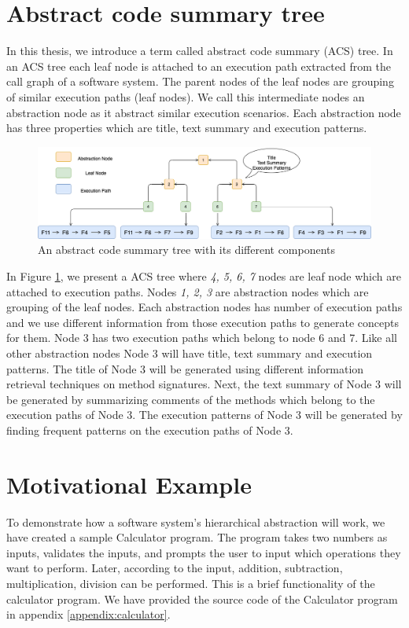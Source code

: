 \section{Abstract code summary tree}
\label{background:cct}
In this thesis, we introduce a term called abstract code summary (ACS) tree. In an ACS tree each leaf node is attached to an execution path extracted from the call graph of a software system. The parent nodes of the leaf nodes are grouping of similar execution paths (leaf nodes). We call this intermediate nodes an abstraction node as it abstract similar execution scenarios. Each abstraction node has three properties which are title, text summary and execution patterns. 

\begin{figure}[h]
  \centering
  \includegraphics[width=\columnwidth]{figures/background/cct.png}
  \caption{An abstract code summary tree with its different components }
  \label{background:cct}
\end{figure}
In Figure \ref{background:cct}, we present a ACS tree where \emph{4, 5, 6, 7} nodes are leaf node which are attached to execution paths. Nodes \emph{1, 2, 3} are abstraction nodes which are grouping of the leaf nodes. Each abstraction nodes has number of execution paths and we use different information from those execution paths to generate concepts for them. Node 3 has two execution paths which belong to node 6 and 7. Like all other abstraction nodes Node 3 will have title, text summary and execution patterns. The title of Node 3 will be generated using different information retrieval techniques on method signatures. Next, the text summary of Node 3 will be generated by summarizing comments of the methods which belong to the execution paths of Node 3. The execution patterns of Node 3 will be generated by finding frequent patterns on the execution paths of Node 3.

\section{Motivational Example}
\label{background:motive}
To demonstrate how a software system's hierarchical abstraction will work, we have created a sample Calculator program. The program takes two numbers as inputs, validates the inputs, and prompts the user to input which operations they want to perform. Later, according to the input, addition, subtraction, multiplication, division can be performed. This is a brief functionality of the calculator program. We have provided the source code of the Calculator program in appendix \ref{appendix:calculator}.

